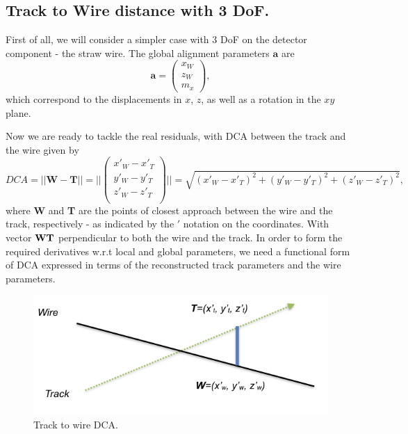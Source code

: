 \documentclass[a4paper,11pt]{article}
\begin{document}
\subsection{Track to Wire distance with 3 DoF.}

First of all, we will consider a simpler case with 3 DoF on the detector component - the straw wire. The global alignment parameters $\textbf{a}$ are
\begin{equation}
\textbf{a} = \begin{pmatrix}x_W \\z_W \\m_x \end{pmatrix},
\end{equation}
which correspond to the displacements in $x$, $z$, as well as a rotation in the $xy$ plane. 

Now we are ready to tackle the real residuals, with DCA between the track and the wire given by
\begin{equation}
DCA = || \textbf{W} - \textbf{T} || = || \begin{pmatrix}x'_W - x'_T\\y'_W - y'_T\\z'_W - z'_T\\\end{pmatrix} || = \sqrt{ (x'_W - x'_T)^2 + (y'_W - y'_T)^2 + (z'_W - z'_T)^2},
\end{equation}
where \textbf{W} and \textbf{T} are the points of closest approach between the wire and the track, respectively - as indicated by the $'$ notation on the coordinates. With vector $\bf{WT}$ perpendicular to both the wire and the track. In order to form the required derivatives w.r.t local and global parameters, we need a functional form of DCA expressed in terms of the reconstructed track parameters and the wire parameters.
\begin{figure}[!ht]
\centering
\includegraphics[width=0.6\linewidth]{fig/WireLine.png}
\caption{Track to wire DCA.}
\label{fig:WireLine}
\end{figure}
\end{document}
